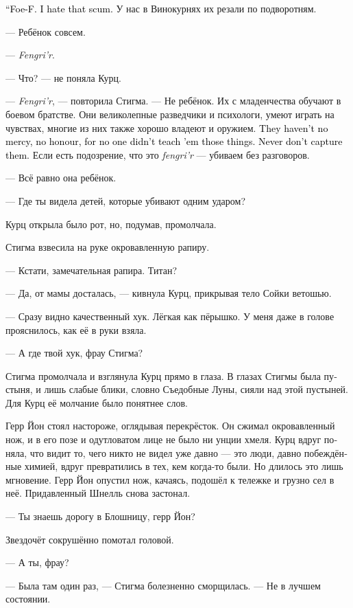 \documentclass[a4paper,12pt,fleqn]{book}\usepackage{cooltooltips}\usepackage{polyglossia}\setdefaultlanguage[babelshorthands=true]{russian}\setotherlanguage{english}\defaultfontfeatures{Ligatures=TeX,Mapping=tex-text} \usepackage{xcolor}\definecolor{lightgray}{HTML}{bbbbbb}\color{lightgray}\newcommand{\ml}[3]{\textenglish{\textcolor{black}{#3}}}
\begin{document}
\ml{$0$}
{--- Фоу-Ф.}
{``Foe-F.}
\ml{$0$}
{Ненавижу этих отбросов.}
{I hate that scum.}
У нас в Винокурнях их резали по подворотням.

--- Ребёнок совсем.

--- \textit{Fengri'r}.

--- Что? --- не поняла Курц.

--- \textit{Fengri'r}, --- повторила Стигма.
--- Не ребёнок.
Их с младенчества обучают в боевом братстве.
Они великолепные разведчики и психологи, умеют играть на чувствах, многие из них также хорошо владеют и оружием.
\ml{$0$}
{Но в них нет ни жалости, ни чести, потому что никто их этому не учил.}
{They haven't no mercy, no honour, for no one didn't teach 'em those things.}
\ml{$0$}
{В плен таких не берём.}
{Never don't capture them.}
Если есть подозрение, что это \textit{fengri'r} --- убиваем без разговоров.

--- Всё равно она ребёнок.

--- Где ты видела детей, которые убивают одним ударом?

Курц открыла было рот, но, подумав, промолчала.

Стигма взвесила на руке окровавленную рапиру.

--- Кстати, замечательная рапира.
Титан?

--- Да, от мамы досталась, --- кивнула Курц, прикрывая тело Сойки ветошью.

--- Сразу видно качественный хук.
Лёгкая как пёрышко.
У меня даже в голове прояснилось, как её в руки взяла.

--- А где твой хук, фрау Стигма?

Стигма промолчала и взглянула Курц прямо в глаза.
В глазах Стигмы была пустыня, и лишь слабые блики, словно Съедобные Луны, сияли над этой пустыней.
Для Курц её молчание было понятнее слов.

Герр Йон стоял настороже, оглядывая перекрёсток.
Он сжимал окровавленный нож, и в его позе и одутловатом лице не было ни унции хмеля.
Курц вдруг поняла, что видит то, чего никто не видел уже давно --- это люди, давно побеждённые химией, вдруг превратились в тех, кем когда-то были.
Но длилось это лишь мгновение.
Герр Йон опустил нож, качаясь, подошёл к тележке и грузно сел в неё.
Придавленный Шнелль снова застонал.

--- Ты знаешь дорогу в Блошницу, герр Йон?

Звездочёт сокрушённо помотал головой.

--- А ты, фрау?

--- Была там один раз, --- Стигма болезненно сморщилась.
--- Не в лучшем состоянии.
\end{document}
